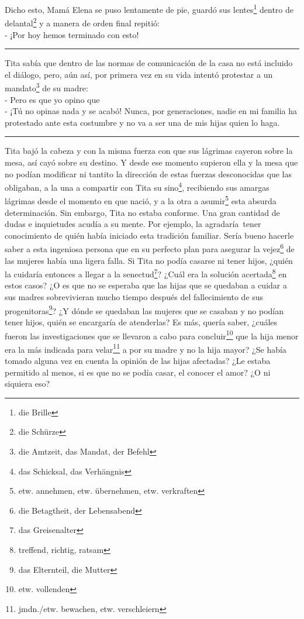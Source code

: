 Dicho esto, Mamá Elena se puso lentamente de pie, guardó sus lentes\footnote{die Brille} dentro de delantal\footnote{die Schürze} y a manera de orden final
repitió:
\\- ¡Por hoy hemos terminado con esto! \\
\rule{1em}{0pt}Tita sabía que dentro de las normas de comunicación de la casa no está
incluido el diálogo, pero, aún así, por primera vez en su vida intentó
protestar a un mandato\footnote{die Amtzeit, das Mandat, der Befehl}
de su madre:
\\- Pero es que yo opino que \ndots %
\\- ¡Tú no opinas nada y se acabó! Nunca, por generaciones, nadie en mi %
familia ha protestado ante esta costumbre y no va a ser una de mis hijas %
quien lo haga. \\
\rule{1em}{0pt}Tita bajó la cabeza y con la misma fuerza con que sus lágrimas cayeron
sobre la mesa, así cayó sobre su destino. Y desde ese momento supieron
ella y la mesa que no podían modificar ni tantito la dirección de estas
fuerzas desconocidas que las obligaban, a la una a compartir con Tita
su sino\footnote{das Schicksal, das Verhängnis}, recibiendo sus
amargas lágrimas desde el momento en que nació, y a la otra
a asumir\footnote{etw. annehmen, etw. übernehmen, etw. verkraften}
esta absurda determinación.
Sin embargo, Tita no estaba conforme. Una gran cantidad de dudas e
inquietudes acudía a su mente.
Por ejemplo, la agradaría~tener conocimiento de quién había
iniciado esta tradición familiar. Sería bueno hacerle saber a esta
ingeniosa persona que en su perfecto plan para asegurar la vejez\footnote{die Betagtheit, der Lebensabend} de las mujeres
había una ligera falla. Si Tita no podía casarse ni tener hijos,
¿quién la cuidaría entonces a llegar a la senectud\footnote{das Greisenalter}?
¿Cuál era la solución acertada\footnote{treffend, richtig, ratsam}
en estos casos? ¿O es que no se esperaba que las hijas que se quedaban
a cuidar a sus madres sobrevivieran mucho tiempo después del fallecimiento
de sus progenitoras\footnote{das Elternteil, die Mutter}?
¿Y dónde se quedaban las mujeres que se casaban y no podían tener hijos,
quién se encargaría de atenderlas? Es más, quería saber, ¿cuáles fueron
las investigaciones que se llevaron a cabo para concluir\footnote{etw. vollenden} que la hija menor era la más
indicada para velar\footnote{jmdn./etw. bewachen, etw. verschleiern}
a por su madre y no la hija mayor? ¿Se había tomado alguna vez en cuenta
la opinión de las hijas afectadas? ¿Le estaba permitido al menos, si es
que no se podía casar, el conocer el amor? ¿O ni siquiera eso?

